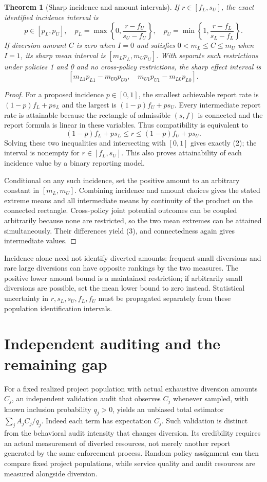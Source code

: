 \documentclass[11pt,a4paper]{article}
\newtheorem{theorem}{Theorem}[section]
\theoremstyle{definition}
\theoremstyle{remark}
\begin{document}
\begin{theorem}[Sharp incidence and amount intervals]
If $r\in[f_L,s_U]$, the exact identified incidence interval is
\[
 p\in[p_L,p_U],\quad
 p_L=\max\left\{0,\frac{r-f_U}{s_U-f_U}\right\},\quad
 p_U=\min\left\{1,\frac{r-f_L}{s_L-f_L}\right\}.\tag{2}
\]
If diversion amount $C$ is zero when $I=0$ and satisfies $0<m_L\leq C\leq m_U$ when $I=1$, its sharp mean interval is $[m_Lp_L,m_Up_U]$. With separate such restrictions under policies 1 and 0 and no cross-policy restrictions, the sharp effect interval is
\[
 [m_{L1}p_{L1}-m_{U0}p_{U0},\quad
   m_{U1}p_{U1}-m_{L0}p_{L0}].\tag{3}
\]
\end{theorem}
\begin{proof}
For a proposed incidence $p\in[0,1]$, the smallest achievable report rate is $(1-p)f_L+ps_L$ and the largest is $(1-p)f_U+ps_U$. Every intermediate report rate is attainable because the rectangle of admissible $(s,f)$ is connected and the report formula is linear in these variables. Thus compatibility is equivalent to
\[
 (1-p)f_L+ps_L\leq r\leq(1-p)f_U+ps_U.
\]
Solving these two inequalities and intersecting with $[0,1]$ gives exactly (2); the interval is nonempty for $r\in[f_L,s_U]$. This also proves attainability of each incidence value by a binary reporting model.

Conditional on any such incidence, set the positive amount to an arbitrary constant in $[m_L,m_U]$. Combining incidence and amount choices gives the stated extreme means and all intermediate means by continuity of the product on the connected rectangle. Cross-policy joint potential outcomes can be coupled arbitrarily because none are restricted, so the two mean extremes can be attained simultaneously. Their differences yield (3), and connectedness again gives intermediate values.
\end{proof}

Incidence alone need not identify diverted amounts: frequent small diversions and rare large diversions can have opposite rankings by the two measures. The positive lower amount bound is a maintained restriction; if arbitrarily small diversions are possible, set the mean lower bound to zero instead. Statistical uncertainty in $r,s_L,s_U,f_L,f_U$ must be propagated separately from these population identification intervals.

\section{Independent auditing and the remaining gap}
For a fixed realized project population with actual exhaustive diversion amounts $C_j$, an independent validation audit that observes $C_j$ whenever sampled, with known inclusion probability $q_j>0$, yields an unbiased total estimator $\sum_j A_jC_j/q_j$. Indeed each term has expectation $C_j$. Such validation is distinct from the behavioral audit intensity that changes diversion. Its credibility requires an actual measurement of diverted resources, not merely another report generated by the same enforcement process. Random policy assignment can then compare fixed project populations, while service quality and audit resources are measured alongside diversion.
\end{document}
